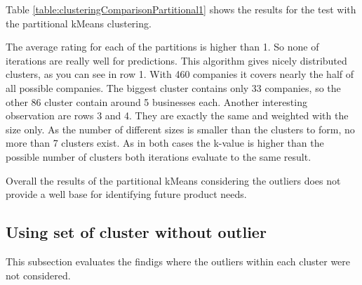 Table \ref{table:clusteringComparisonPartitional1} shows the results for the test with the partitional kMeans clustering.

The average rating for each of the partitions is higher than 1. So none of iterations are really well for predictions.
This algorithm gives nicely distributed clusters, as you can see in row 1. With 460 companies it covers nearly the half of
all possible companies. The biggest cluster contains only 33 companies, so the other 86 cluster contain around 5 businesses each.
Another interesting observation are rows 3 and 4. They are exactly the same and weighted with the size only. As the number of different sizes
is smaller than the clusters to form, no more than 7 clusters exist. As in both cases the k-value is higher than the possible
number of clusters both iterations evaluate to the same result.

Overall the results of the partitional kMeans considering the outliers does not provide a well base for identifying future
product needs.

\subsection{Using set of cluster without outlier}
This subsection evaluates the findigs where the outliers within each cluster were not considered.

